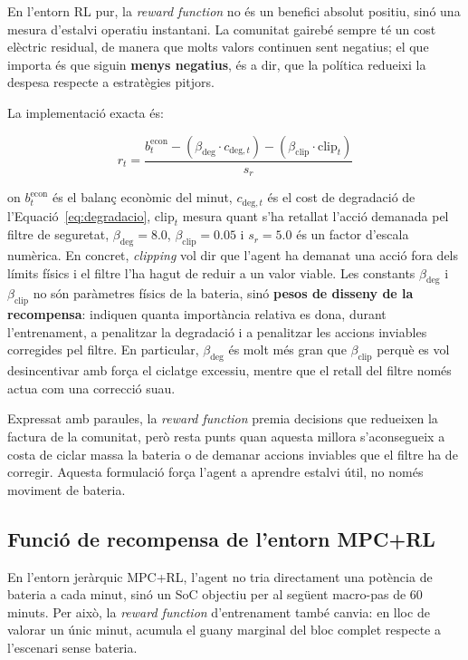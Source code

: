 \documentclass[a4paper,12pt,twoside]{ThesisStyle}
\begin{document}
En l'entorn RL pur, la \textit{reward function} no és un benefici absolut positiu, sinó una mesura d'estalvi operatiu instantani. La comunitat gairebé sempre té un cost elèctric residual, de manera que molts valors continuen sent negatius; el que importa és que siguin \textbf{menys negatius}, és a dir, que la política redueixi la despesa respecte a estratègies pitjors.

La implementació exacta és:

\begin{equation}
  r_t = \frac{b_t^{\mathrm{econ}} - \left(\beta_{\mathrm{deg}} \cdot c_{\mathrm{deg},t}\right) - \left(\beta_{\mathrm{clip}} \cdot \mathrm{clip}_t\right)}{s_r}
  \label{eq:recompensa}
\end{equation}

on $b_t^{\mathrm{econ}}$ és el balanç econòmic del minut, $c_{\mathrm{deg},t}$ és el cost de degradació de l'Equació~\eqref{eq:degradacio}, $\mathrm{clip}_t$ mesura quant s'ha retallat l'acció demanada pel filtre de seguretat, $\beta_{\mathrm{deg}} = 8.0$, $\beta_{\mathrm{clip}} = 0.05$ i $s_r = 5.0$ és un factor d'escala numèrica. En concret, \textit{clipping} vol dir que l'agent ha demanat una acció fora dels límits físics i el filtre l'ha hagut de reduir a un valor viable. Les constants $\beta_{\mathrm{deg}}$ i $\beta_{\mathrm{clip}}$ no són paràmetres físics de la bateria, sinó \textbf{pesos de disseny de la recompensa}: indiquen quanta importància relativa es dona, durant l'entrenament, a penalitzar la degradació i a penalitzar les accions inviables corregides pel filtre. En particular, $\beta_{\mathrm{deg}}$ és molt més gran que $\beta_{\mathrm{clip}}$ perquè es vol desincentivar amb força el ciclatge excessiu, mentre que el retall del filtre només actua com una correcció suau.

Expressat amb paraules, la \textit{reward function} premia decisions que redueixen la factura de la comunitat, però resta punts quan aquesta millora s'aconsegueix a costa de ciclar massa la bateria o de demanar accions inviables que el filtre ha de corregir. Aquesta formulació força l'agent a aprendre estalvi útil, no només moviment de bateria.

\subsection{Funció de recompensa de l'entorn MPC+RL}

En l'entorn jeràrquic MPC+RL, l'agent no tria directament una potència de bateria a cada minut, sinó un SoC objectiu per al següent macro-pas de 60 minuts. Per això, la \textit{reward function} d'entrenament també canvia: en lloc de valorar un únic minut, acumula el guany marginal del bloc complet respecte a l'escenari sense bateria.
\end{document}

